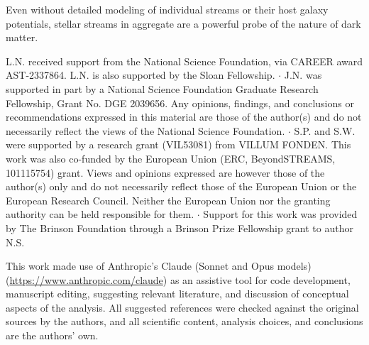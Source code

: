 \documentclass[linenumbers,twocolumn]{aastex701}
\begin{document}
    Even without detailed modeling of individual streams or their host galaxy potentials, stellar streams in aggregate are a powerful probe of the nature of dark matter. %


\newpage
\begin{acknowledgments}
    L.N. received support from the National Science Foundation, via CAREER award AST-2337864. L.N. is also supported by the Sloan Fellowship. 
    $\cdot$
    J.N. was supported in part by a National Science Foundation Graduate Research Fellowship, Grant No. DGE 2039656. Any opinions, findings, and conclusions or recommendations expressed in this material are those of the author(s) and do not necessarily reflect the views of the National Science Foundation. %
    $\cdot$
    S.P. and S.W. were supported by a research grant (VIL53081) from VILLUM FONDEN. This work was also co-funded by the European Union (ERC, BeyondSTREAMS, 101115754) grant. Views and opinions expressed are however those of the author(s) only and do not necessarily reflect those of the European Union or the European Research Council. Neither the European Union nor the granting authority can be held responsible for them.
    $\cdot$
    Support for this work was provided by The Brinson Foundation through a Brinson Prize Fellowship grant to author N.S. 

    \vspace{10pt}
    This work made use of Anthropic's Claude (Sonnet and Opus models) (\url{https://www.anthropic.com/claude}) as an assistive tool for code development, manuscript editing, suggesting relevant literature, and discussion of conceptual aspects of the analysis. All suggested references were checked against the original sources by the authors, and all scientific content, analysis choices, and conclusions are the authors' own.

\end{acknowledgments}

\end{document}
